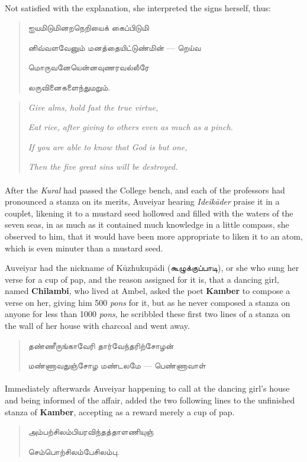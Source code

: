 \documentclass{article}
\newcommand{\TamilText}[1]{\texttamil{#1}}
\newcommand{\tam}[1]{\TamilText{#1}}
\begin{document}
\paragraph{}
Not satisfied with the explanation, she interpreted the signs herself, thus:
\begin{quotation}\small
\tam{ஐயமிடுமினறநெறியைக் கைப்பிடுமி}

\tam{னிவ்வளவேனும்‌ மனத்தையிட்டுண்மின்‌} --- \tam{றெய்வ}

\tam{மொருவனேயென்னவுணரவல்லீரே}

\tam{லருவினைகளைந்துமறும்‌}.
\end{quotation}
\begin{quotation}\small
\emph{Give alms, hold fast the true virtue,}

\emph{Eat rice, after giving to others even as much as a pinch.}

\emph{If you are able to know that God is but one,}

\emph{Then the five great sins will be destroyed.}
\end{quotation}
\paragraph{}
After the \emph{Kural} had passed the College bench, and each of the professors had pronounced a stanza on its merits, Auveiyar hearing \emph{Ideik\={a}der} praise it in a couplet, likening it to a mustard seed hollowed and filled with the waters of the seven seas, in as much as it contained much knowledge in a little compass, she observed to him, that it would have been more appropriate to liken it to an atom, which is even minuter than a mustard seed.

Auveiyar had the nickname of K\={u}zhukup\={a}di (\tam{கூழுக்குப்பாடி}), or she who sung her verse for a cup of pap, and the reason assigned for it is, that a dancing girl, named \textbf{Chilambi}, who lived at Ambel, asked the poet \textbf{Kamber} to compose a verse on her, giving him 500 \emph{pons} for it, but as he never composed a stanza on anyone for less than 1000 \emph{pons}, he scribbled these first two lines of a stanza on the wall of her house with charcoal and went away.
\begin{quotation}\small
\tam{தண்ணீருங்காவேரி தார்வேந்தரிற்சோழன்}

\tam{மண்ணாவதுஞ்சோழ மண்டலமே} --- \tam{பெண்ணாவாள்}
\end{quotation}
\paragraph{}
Immediately afterwards Auveiyar happening to call at the dancing girl's house and being informed of the affair, added the two following lines to the unfinished stanza of \textbf{Kamber}, accepting as a reward merely a cup of pap.
\begin{quotation}\small
\tam{அம்பற்சிலம்பியரவிந்தத்தாளணியுஞ்}

\tam{செம்பொற்சிலம்பேசிலம்பு}.
\end{quotation}
\end{document}
